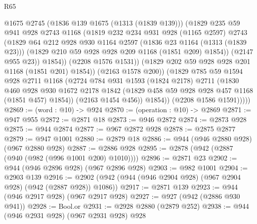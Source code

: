 \begin{lexlean}{R65}
\begin{coremodule}
                      @1675
                      @2745
                      (@1836 @139 @1675 (@1313 (@1839 @139)))
                      (@1829
                        @235
                        @59
                        @941
                        @928
                        @2743
                        @1168
                        (@1819
                          @232
                          @234
                          @931
                          @928
                          (@1165 @2597)
                          @2743
                          (@1829
                            @64
                            @212
                            @928
                            @930
                            @1164
                            @2597
                            (@1836 @23 @1164 (@1313 (@1839 @23)))
                            (@1829 @210 @59 @928 @928 @209 @1168 (@1851 @209) @1854))
                          (@2147 @955 @23))
                        @1854))
                    (@2208 @1576 @1531))
                  (@1829 @202 @59 @928 @928 @201 @1168 (@1851 @201) @1854))
                (@2163 @1578 @200))
              (@1829
                @785
                @59
                @1594
                @928
                @2711
                @1168
                (@2724
                  @784
                  @931
                  @1593
                  (@1824 @2178)
                  @2711
                  (@1830
                    @460
                    @928
                    @930
                    @1672
                    @2178
                    @1842
                    (@1829 @458 @59 @928 @928 @457 @1168 (@1851 @457) @1854))
                  (@2163 @1454 @456))
                @1854))
            (@2208 @1586 @1591)))))
@2869 := (word : @10) -> @924
@2870 := (operation : @10) -> @2869
@2871 := @947 @955
@2872 := @2871 @18
@2873 := @946 @2872
@2874 := @2873 @928
@2875 := @944 @2874
@2877 := @967 @2872 @928
@2878 := @2875 @2877
@2879 := @947 @1001
@2880 := @2879 @18
@2886 := @944 (@946 @2880 @928) (@967 @2880 @928)
@2887 := @2886 @928
@2895 := @2878 (@942 (@2887 (@940 (@982 (@996 @1001 @200) @1010))))
@2896 := @2871 @23
@2902 := @944 (@946 @2896 @928) (@967 @2896 @928)
@2903 := @982 @1001
@2904 := @2903 @139
@2916 := @2902 (@942 (@944 (@946 @2904 @928) (@967 @2904 @928) (@942 (@2887 @928)) @1086))
@2917 := @2871 @139
@2923 := @944 (@946 @2917 @928) (@967 @2917 @928)
@2927 := @927 (@942 (@2886 @930 @941))
@2928 := Bool.or
@2931 := @2928 @2880 (@2879 @252)
@2938 := @944 (@946 @2931 @928) (@967 @2931 @928) @928

\end{coremodule}
\end{lexlean}
